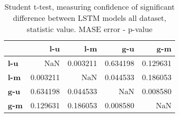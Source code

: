 \begin{table}[h]
\centering
\caption{Student t-test, measuring confidence of significant difference between LSTM models all dataset, statistic value. MASE error - p-value}
\label{table:ttest-p-values-lstm-experiments-MASE-all-datasets}
\begin{tabular}{lrrrr}
\toprule
{} &       l-u &       l-m &       g-u &       g-m \\
\midrule
\textbf{l-u} &       NaN &  0.003211 &  0.634198 &  0.129631 \\
\textbf{l-m} &  0.003211 &       NaN &  0.044533 &  0.186053 \\
\textbf{g-u} &  0.634198 &  0.044533 &       NaN &  0.008580 \\
\textbf{g-m} &  0.129631 &  0.186053 &  0.008580 &       NaN \\
\bottomrule
\end{tabular}
\end{table}
